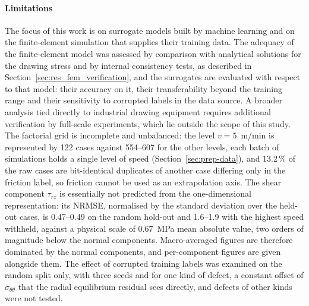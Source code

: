 \documentclass[subscriptcorrection,upint,varvw,barcolor=Goldenrod3,mathalfa=cal=euler,balance,hyphenate,french,pdf-a]{asmejour} %
\begin{document}
\paragraph{Limitations}
The focus of this work is on surrogate models built by machine learning and on the finite-element simulation that supplies their training data. The adequacy of the finite-element model was assessed by comparison with analytical solutions for the drawing stress and by internal consistency tests, as described in Section~\ref{sec:res_fem_verification}, and the surrogates are evaluated with respect to that model: their accuracy on it, their transferability beyond the training range and their sensitivity to corrupted labels in the data source. A broader analysis tied directly to industrial drawing equipment requires additional verification by full-scale experiments, which lie outside the scope of this study. %
The factorial grid is incomplete and unbalanced: the level $v = 5$~m/min is represented by 122 cases against 554--607 for the other levels, each batch of simulations holds a single level of speed (Section~\ref{sec:prep-data}), and 13.2\,\% of the raw cases are bit-identical duplicates of another case differing only in the friction label, so friction cannot be used as an extrapolation axis. %
The shear component $\tau_{rz}$ is essentially not predicted from the one-dimensional representation: its NRMSE, normalised by the standard deviation over the held-out cases, is 0.47--0.49 on the random hold-out and 1.6--1.9 with the highest speed withheld, against a physical scale of 0.67~MPa mean absolute value, two orders of magnitude below the normal components. Macro-averaged figures are therefore dominated by the normal components, and per-component figures are given alongside them. %
The effect of corrupted training labels was examined on the random split only, with three seeds and for one kind of defect, a constant offset of $\sigma_{\theta\theta}$ that the radial equilibrium residual sees directly, and defects of other kinds were not tested. %
\end{document}
